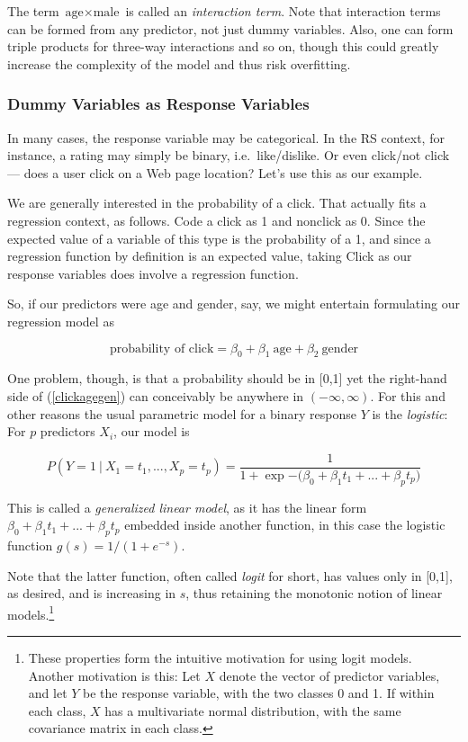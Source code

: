 The term $\textrm{age} \times \textrm{male}$ is called an
\textit{interaction term}.  Note that interaction terms can be formed
from any predictor, not just dummy variables.  Also, one can form triple
products for three-way interactions and so on, though this could greatly
increase the complexity of the model and thus risk overfitting.


\subsubsection{Dummy Variables as Response Variables}

In many cases, the response variable may be categorical.  In the RS
context, for instance, a rating may simply be binary, i.e.\
like/dislike.  Or even click/not click --- does a user click on a Web page
location?  Let's use this as our example.

We are generally interested in the probability of a click.  That
actually fits a regression context, as follows.  Code a click as 1 and
nonclick as 0.  Since the expected value of a variable of this type is
the probability of a 1, and since a regression function by definition
is an expected value, taking Click as our response variables does
involve a regression function.

So, if our predictors were age and gender, say, we might entertain
formulating our regression model as

\begin{equation}
\label{clickagegen}
\textrm{probability of click} = \beta_0 + \beta_1 ~ \textrm{age} +
\beta_2 ~ \textrm{gender}
\end{equation}

One problem, though, is that a probability should be in [0,1] yet the
right-hand side of (\ref{clickagegen}) can conceivably be anywhere in
$(-\infty,\infty)$.  For this and other reasons the usual parametric
model for a binary response $Y$ is the \textit{logistic}:  For $p$
predictors $X_i$, our model is

\begin{equation}
P(Y  = 1 ~|~ X_1=t_1,...,X_p=t_p) =
\frac{1}{1+\exp{-(\beta_0+\beta_1 t_1+...+\beta_p t_p})}
\end{equation}

This is called a \textit{generalized linear model}, as it has the linear
form $\beta_0+\beta_1 t_1+...+\beta_p t_p$ embedded inside
another function, in this case the logistic function $g(s) =
1/(1+e^{-s})$.

Note that the latter function, often called \textit{logit} for short,
has values only in [0,1], as desired, and is increasing in $s$, thus
retaining the monotonic notion of linear models.\footnote{These
properties form the intuitive motivation for using logit models.
Another motivation is this: Let $X$ denote the vector of predictor
variables, and let $Y$ be the response variable, with the two classes 0
and 1.  If within each class, $X$ has a multivariate normal
distribution, with the same covariance matrix in each class.}

